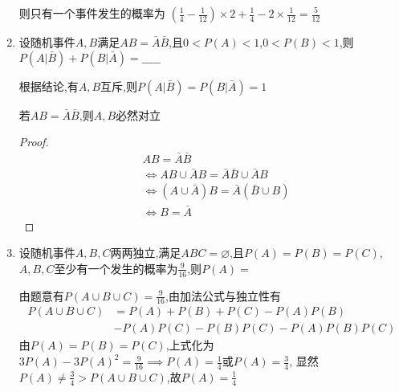 \documentclass[12pt, a4paper, oneside, UTF8]{ctexbook}
\begin{document}
\begin{enumerate}[label=\arabic*.]
\begin{solution}
\begin{center}
    \end{center}
    则只有一个事件发生的概率为
        $(\frac{1}{4} - \frac{1}{12})\times 2 + \frac{1}{4} 
        - 2\times \frac{1}{12} = \frac{5}{12}$
    \end{solution}
    
    \item 设随机事件$A,B$满足$AB=\bar{A}\bar{B}$,且$0<P(A)<1$,$0<P(B)<1$,则$P(A|\bar{B})+P(B|\bar{A})=\_\_\_\_\_$
    
    \begin{solution}
    根据结论,有$A,B$互斥,则$P(A|\bar{B})=P(B|\bar{A})=1$
    \end{solution}

    \begin{corollary}
        若$AB=\bar{A}\bar{B}$,则$A,B$必然对立
        \begin{proof}
            \begin{align*}
                &AB =\bar{A}\bar{B} \\
                &\iff AB\cup \bar{A}B =\bar{A}\bar{B}\cup \bar{A}B \\
                &\iff (A\cup \bar{A})B = \bar{A}(\bar{B}\cup B) \\
                &\iff B = \bar{A}
            \end{align*}
        \end{proof}
    \end{corollary}

    \item 设随机事件$A,B,C$两两独立,满足$ABC=\varnothing$,且$P(A)=P(B)=P(C)$,$A,B,C$至少有一个发生的概率为$\frac{9}{16}$,则$P(A)=$
    
    \begin{solution}
    由题意有$P(A\cup B\cup C) = \frac{9}{16}$,由加法公式与独立性有
    \begin{align*}
        P(A\cup B\cup C) 
        &= P(A) + P(B) + P(C) - P(A)P(B) \\
        &- P(A)P(C) - P(B)P(C) - P(A)P(B)P(C)
    \end{align*}
    由$P(A)=P(B)=P(C)$,上式化为$3P(A)-3P(A)^2 = \frac{9}{16}\implies P(A)=\frac{1}{4}\text{或}P(A)=\frac{3}{4}$,
    显然$P(A)\neq \frac{3}{4} > P(A\cup B\cup C)$,故$P(A)=\frac{1}{4}$
    \end{solution}
    

\end{enumerate}
\end{document}
